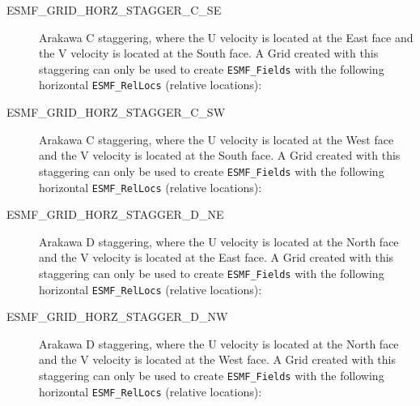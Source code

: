 \begin{description}
    \item [ESMF\_GRID\_HORZ\_STAGGER\_C\_SE]
          Arakawa C staggering, where the U velocity is located at the East face
          and the V velocity is located at the South face.  A Grid created with
          this staggering can only be used to create {\tt ESMF\_Fields} with the
          following horizontal {\tt ESMF\_RelLocs} (relative locations):

    \item [ESMF\_GRID\_HORZ\_STAGGER\_C\_SW]
          Arakawa C staggering, where the U velocity is located at the West face
          and the V velocity is located at the South face.  A Grid created with
          this staggering can only be used to create {\tt ESMF\_Fields} with the
          following horizontal {\tt ESMF\_RelLocs} (relative locations):

    \item [ESMF\_GRID\_HORZ\_STAGGER\_D\_NE]
          Arakawa D staggering, where the U velocity is located at the North face
          and the V velocity is located at the East face.  A Grid created with
          this staggering can only be used to create {\tt ESMF\_Fields} with the
          following horizontal {\tt ESMF\_RelLocs} (relative locations):

    \item [ESMF\_GRID\_HORZ\_STAGGER\_D\_NW]
          Arakawa D staggering, where the U velocity is located at the North face
          and the V velocity is located at the West face.  A Grid created with
          this staggering can only be used to create {\tt ESMF\_Fields} with the
          following horizontal {\tt ESMF\_RelLocs} (relative locations):


\end{description}
